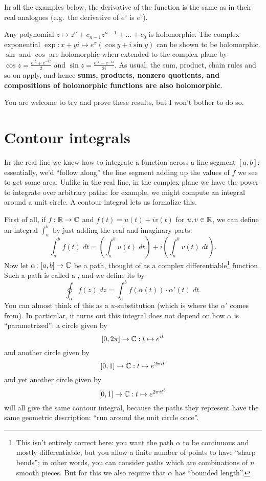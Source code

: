 \begin{example}
	In all the examples below, the derivative of the function
	is the same as in their real analogues
	(e.g.\ the derivative of $e^z$ is $e^z$).
	\begin{enumerate}[(a)]
		\ii Any polynomial $z \mapsto z^n + c_{n-1} z^{n-1} + \dots + c_0$ is holomorphic.
		\ii The complex exponential $\exp \colon x+yi \mapsto e^x (\cos y + i \sin y)$
		can be shown to be holomorphic.
		\ii $\sin$ and $\cos$ are holomorphic when extended
		to the complex plane by $\cos z = \frac{e^{iz}+e^{-iz}}{2}$
		and $\sin z = \frac{e^{iz}-e^{-iz}}{2i}$.
		\ii As usual, the sum, product, chain rules and so on apply,
		and hence \textbf{sums, products, nonzero quotients,
		and compositions of holomorphic functions are also holomorphic}.
	\end{enumerate}
\end{example}
You are welcome to try and prove these results, but I won't bother to do so.

\section{Contour integrals}
In the real line we knew how to integrate a function across a line segment $[a,b]$:
essentially, we'd ``follow along'' the line segment adding up the values of $f$ we see
to get some area.
Unlike in the real line, in the complex plane we have the power to integrate
over arbitrary paths: for example, we might compute an integral around a unit circle.
A contour integral lets us formalize this.

First of all, if $f \colon \mathbb R \to \mathbb C$ and $f(t) = u(t) + iv(t)$ for $u,v \in \mathbb R$,
we can define an integral $\int_a^b$ by just adding the real and imaginary parts:
\[ \int_a^b f(t) \; dt
	= \left( \int_a^b u(t) \; dt \right)
	+ i \left( \int_a^b v(t) \; dt \right). \]
Now let $\alpha \colon [a,b] \to \mathbb C$ be a path, thought of as
a complex differentiable\footnote{This isn't entirely correct here:
	you want the path $\alpha$ to be continuous and mostly differentiable,
	but you allow a finite number of points to have ``sharp bends''; in other words,
	you can consider paths which are combinations of $n$ smooth pieces.
	But for this we also require that $\alpha$ has ``bounded length''.} function.
Such a path is called a ,
and we define its  by
\[
	\oint_\alpha f(z) \; dz
	= \int_a^b f(\alpha(t)) \cdot \alpha'(t) \; dt.
\]
You can almost think of this as a $u$-substitution (which is where the $\alpha'$ comes from).
In particular, it turns out this integral does not depend on how $\alpha$ is ``parametrized'':
a circle given by \[ [0,2\pi] \to \mathbb C : t \mapsto e^{it} \]
and another circle given by \[ [0,1] \to \mathbb C : t \mapsto e^{2\pi i t} \]
and yet another circle given by \[ [0,1] \to \mathbb C : t \mapsto e^{2 \pi i t^5} \]
will all give the same contour integral, because the paths they represent have the same
geometric description: ``run around the unit circle once''.

